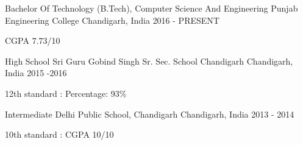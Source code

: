 \begin{cventries}
  \cventry
    {Bachelor Of Technology (B.Tech), Computer Science And Engineering}
    {Punjab Engineering College}
    {Chandigarh, India}
    {2016 - PRESENT}
    {
      \begin{cvitems}
        \item {CGPA 7.73/10}
      \end{cvitems}
    }
     \cventry
    {High School}
    {Sri Guru Gobind Singh Sr. Sec. School Chandigarh }
    {Chandigarh, India}
    {2015 -2016 }
    {
      \begin{cvitems}
        \item {12th standard : Percentage: 93\%}
      \end{cvitems}
    }
    \cventry
    {Intermediate}
    {Delhi Public School, Chandigarh}
    {Chandigarh, India}
    {2013 - 2014}
    {
      \begin{cvitems}
        \item {10th standard : CGPA 10/10}
      \end{cvitems}
    }
\end{cventries}
